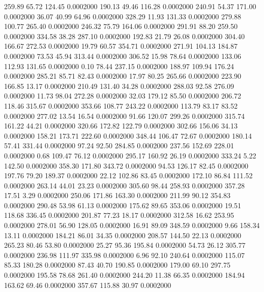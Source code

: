  259.89   65.72  124.45   0.0002000
 190.13   49.46  116.28   0.0002000
 240.91   54.37  171.00   0.0002000
  36.07   40.99   64.96   0.0002000
 328.29   11.93  131.33   0.0002000
 279.88  100.77  265.40   0.0002000
 246.32   75.79  164.06   0.0002000
 291.91   88.20  259.50   0.0002000
 334.58   38.28  287.10   0.0002000
 192.83   21.79   26.08   0.0002000
 304.40  166.67  272.53   0.0002000
  19.79   60.57  354.71   0.0002000
 271.91  104.13  184.87   0.0002000
  73.53   45.94  313.44   0.0002000
 306.52   15.98   78.64   0.0002000
 133.06  112.93  131.65   0.0002000
   0.10   78.44  237.15   0.0002000
 188.97  109.94  176.24   0.0002000
 285.21   85.71   82.43   0.0002000
  17.97   80.25  265.66   0.0002000
 223.90  166.85   13.17   0.0002000
 210.49  131.40   34.28   0.0002000
 288.03   92.58  276.09   0.0002000
  11.73   98.04  272.28   0.0002000
  32.03  179.12   85.50   0.0002000
 206.72  118.46  315.67   0.0002000
 353.66  108.77  243.22   0.0002000
 113.79   83.17   83.52   0.0002000
 277.02   13.54   16.54   0.0002000
  91.66  120.07  299.26   0.0002000
 315.74  161.22   44.21   0.0002000
 320.66  172.82  122.79   0.0002000
 302.66  156.06   34.13   0.0002000
 158.21  173.71  222.60   0.0002000
 348.44  106.47   72.67   0.0002000
 180.14   57.41  331.44   0.0002000
  97.24   92.50  284.85   0.0002000
 237.56  152.69  228.01   0.0002000
   0.68  109.47   76.12   0.0002000
 295.17  160.92   26.19   0.0002000
 333.24    5.22  142.50   0.0002000
 358.30  171.80  343.72   0.0002000
  94.53  126.17   82.45   0.0002000
 197.76   79.20  189.37   0.0002000
  22.12  102.86   83.45   0.0002000
 172.10   86.84  111.52   0.0002000
 263.14   44.01   23.23   0.0002000
 305.60   98.44  258.93   0.0002000
 357.28   17.51    3.29   0.0002000
 250.06  171.86  163.30   0.0002000
 211.99   90.12  354.83   0.0002000
 290.48   53.98   61.13   0.0002000
 175.62   89.65  353.06   0.0002000
  19.51  118.68  336.45   0.0002000
 201.87   77.23   18.17   0.0002000
 312.58   16.62  253.95   0.0002000
 278.01   56.90  128.05   0.0002000
  16.91   89.09  348.59   0.0002000
   9.66  158.34   13.11   0.0002000
 184.21   86.01   34.35   0.0002000
 208.57  144.50   22.13   0.0002000
 265.23   80.46   53.80   0.0002000
  25.27   95.36  195.84   0.0002000
  54.73   26.12  305.77   0.0002000
 236.98  111.97  335.98   0.0002000
   6.96   92.10  240.64   0.0002000
 115.07   85.33  180.28   0.0002000
  87.43   40.70  190.85   0.0002000
 179.00   69.10  297.75   0.0002000
 195.58   78.68  261.40   0.0002000
 244.20   11.38   66.35   0.0002000
 184.94  163.62   69.46   0.0002000
 357.67  115.88   30.97   0.0002000
